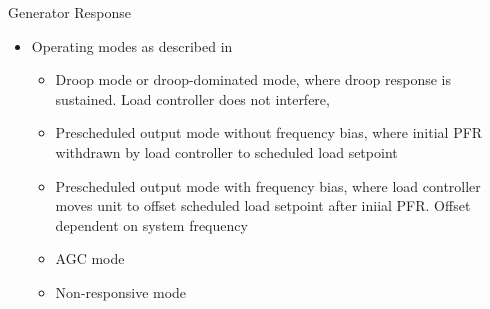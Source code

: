 \begin{frame}{Generator Response}
\begin{itemize}
\item Operating modes as described in \cite{Undrill2018}
    \begin{itemize}
        \item Droop mode or droop-dominated mode, where droop response is sustained. Load controller does not interfere,
        \item Prescheduled output mode without frequency bias, where initial PFR withdrawn by load controller to scheduled load setpoint
        \item Prescheduled output mode with frequency bias, where load controller moves unit to offset scheduled load setpoint after iniial PFR. Offset dependent on system frequency
        \item AGC mode
        \item Non-responsive mode
    \end{itemize}
\end{itemize}
\end{frame}